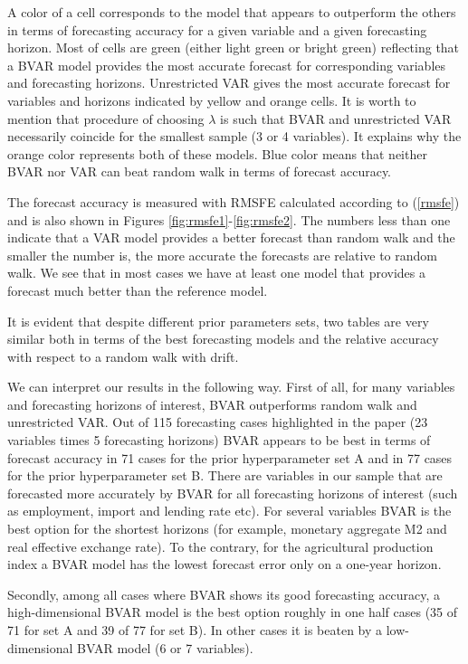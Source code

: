 \documentclass[11pt]{article} %
\begin{document}
A color of a cell corresponds to the model that appears to outperform the others in terms of forecasting accuracy for a given variable and a given forecasting horizon. Most of cells are green (either light green or bright green) reflecting that a BVAR model provides the most accurate forecast for corresponding  variables and forecasting horizons. Unrestricted VAR gives the most accurate forecast for variables and horizons indicated by yellow and orange cells. It is worth to mention that procedure of choosing $\lambda$ is such that BVAR and unrestricted VAR  necessarily coincide  for the smallest sample (3 or 4 variables). It explains why the orange color represents both of these models.  Blue color means that neither BVAR nor VAR can beat random walk in terms of forecast accuracy.

The forecast accuracy is measured with RMSFE calculated according to (\ref{rmsfe}) and is also shown in Figures \ref{fig:rmsfe1}-\ref{fig:rmsfe2}. 
The numbers less than one indicate that a VAR model provides a better forecast than random walk and the smaller the number is, the more accurate the forecasts are relative to random walk.  We see that in most cases we have at least one model that provides a forecast much better than the reference model. 

It is evident that despite different prior parameters sets,  two tables are very similar both in terms of the best forecasting models and  the relative accuracy  with respect to a random walk with drift. 

We can interpret our results in the following way. First of all, for many variables and forecasting horizons of interest, BVAR outperforms random walk and unrestricted VAR. Out of 115 forecasting cases highlighted in the paper (23 variables times 5 forecasting horizons) BVAR appears to be best in terms of forecast accuracy in 71 cases for the prior hyperparameter set A and in 77 cases for the prior hyperparameter set B.  There are variables in our sample that are forecasted more accurately by BVAR for all forecasting horizons of interest  (such as employment, import and lending rate etc). For several variables BVAR is the best option for the shortest horizons (for example, monetary aggregate M2 and real effective exchange rate). To the contrary, for the agricultural production index a BVAR model has the lowest forecast error only on a one-year horizon.  

Secondly, among all cases where BVAR shows its good forecasting accuracy, a high-dimensional BVAR model is the best option roughly in one half cases (35 of 71 for set A and 39 of 77 for set B).  In other cases it is beaten by a low-dimensional BVAR model (6 or 7 variables). 
\end{document}
